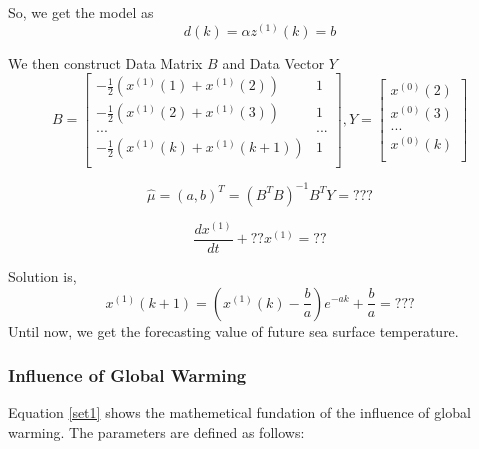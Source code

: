 \documentclass{mcmthesis}
\begin{document}
	So, we get the model as
\begin{equation*}
	d(k) = \alpha z^{(1)}(k) = b
\end{equation*}\par
	We then construct Data Matrix $B$ and Data Vector $Y$
\begin{equation}
	B =  \left[ \begin{matrix}
						-\frac{1}{2}(x^{(1)}(1)+x^{(1)}(2))  & 1 \\
						-\frac{1}{2}(x^{(1)}(2)+x^{(1)}(3))  & 1 \\
										...									& ... \\
						-\frac{1}{2}(x^{(1)}(k)+x^{(1)}(k+1))  & 1 \\
\end{matrix}\right],
	Y =  \left[ \begin{matrix}
						x^{(0)}(2)\\
						x^{(0)}(3)\\
							...    \\
						x^{(0)}(k)\\
\end{matrix}\right]
\end{equation}\par
\begin{equation*} 
	\hat{\mu} = (a, b)^{T} = (B^{T}B)^{-1}B^{T}Y = ???
\end{equation*}\par
\begin{equation*}
	\frac{dx^{(1)}}{dt} + ?? x^{(1)} = ??
\end{equation*}\par
	Solution is, 
\begin{equation*}
	x^{(1)}(k+1) = (x^{(1)}(k) - \frac{b}{a})e^{-ak} + \frac{b}{a} = ???
\end{equation*}
	Until now, we get the forecasting value of future sea surface temperature.\par
	
\subsubsection{Influence of Global Warming}\label{S4ss2}
	Equation \ref{set1} shows the mathemetical fundation of the influence of global warming. The parameters are defined as follows:
\end{document}
